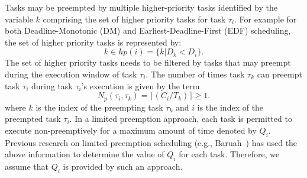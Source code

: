 Tasks may be preempted by multiple higher-priority tasks identified by the variable $k$ comprising the set of higher priority tasks for task \begin{math}\tau_{i}\end{math}. For example for both Deadline-Monotonic (DM) and Earliest-Deadline-First (EDF) scheduling, the set of higher priority tasks is represented by:
\begin{equation}\label{eqn:edf-hp-tasks}
    k \in hp(i) = \{k | D_{k} < D_{i}\}.
\end{equation}
\noindent
The set of higher priority tasks needs to be filtered by tasks that may preempt during the execution window of task \begin{math}\tau_{i}\end{math}.  The number of times task \begin{math}\tau_{k}\end{math} can preempt task \begin{math}\tau_{i}\end{math} during task \begin{math}\tau_{i}\end{math}'s execution is given by the term
\begin{equation}\label{eqn:num-preemptions}
    N_{p}(\tau_{i},\tau_{k})=\lceil(C_{i}/T_{k})\rceil \geq 1.
\end{equation}
\noindent
where $k$ is the index of the preempting task \begin{math}\tau_{k}\end{math} and $i$ is the index of the preempted task \begin{math}\tau_{i}\end{math}.  In a limited preemption approach, each task is permitted to execute non-preemptively for a maximum amount of time denoted by \begin{math}Q_{i}\end{math}.  Previous research on limited preemption scheduling (e.g., Baruah~\cite{baruah:05}) has used the above information to determine the value of $Q_i$ for each task.  Therefore, we assume that $Q_i$ is provided by such an approach.
%

